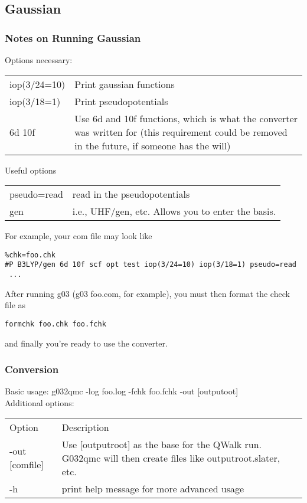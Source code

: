 \documentclass[12pt]{article}
\begin{document}
\newpage
\subsection{Gaussian}
\subsubsection{Notes on Running Gaussian}

Options necessary: \\
\begin{tabular}{lp{8cm}}
iop(3/24=10) & Print gaussian functions \\
iop(3/18=1) & Print pseudopotentials \\
6d 10f & Use 6d and 10f functions, which is what the converter was written for (this requirement could be removed in the future, if someone has the will) \\
\end{tabular}

Useful options \\
\begin{tabular}{lp{8cm}}
pseudo=read & read in the pseudopotentials \\
gen & i.e., UHF/gen, etc. Allows you to enter the basis. \\
\end{tabular}

For example, your com file may look like \\
\begin{verbatim}
%chk=foo.chk
#P B3LYP/gen 6d 10f scf opt test iop(3/24=10) iop(3/18=1) pseudo=read
 ...
\end{verbatim}
After running g03 (g03 foo.com, for example), you must then format the
check file as \\
\begin{verbatim}
formchk foo.chk foo.fchk
\end{verbatim}
and finally you're ready to use the converter.

\subsubsection{Conversion}
Basic usage: g032qmc -log foo.log -fchk foo.fchk -out [outputoot]  \\
Additional options: \\
\begin{tabular}{lp{8cm}}
Option & Description \\
-out [comfile] & Use [outputroot] as the base for the QWalk run.
G032qmc will then create files like outputroot.slater, etc. \\
-h & print help message for more advanced usage\\
\end{tabular}
\end{document}
